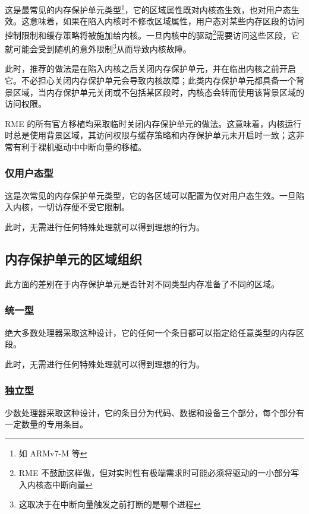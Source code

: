 这是最常见的内存保护单元类型\footnote{如 ARMv7-M 等}，它的区域属性既对内核态生效，也对用户态生效。这意味着，如果在陷入内核时不修改区域属性，用户态对某些内存区段的访问控制限制和缓存策略将被施加给内核。一旦内核中的驱动\footnote{RME 不鼓励这样做，但对实时性有极端需求时可能必须将驱动的一小部分写入内核态中断向量}需要访问这些区段，它就可能会受到随机的意外限制\footnote{这取决于在中断向量触发之前打断的是哪个进程}从而导致内核故障。

此时，推荐的做法是在陷入内核之后关闭内存保护单元，并在临出内核之前开启它。不必担心关闭内存保护单元会导致内核故障；此类内存保护单元都具备一个背景区域，当内存保护单元关闭或不包括某区段时，内核态会转而使用该背景区域的访问权限。

RME 的所有官方移植均采取临时关闭内存保护单元的做法。这意味着，内核运行时总是使用背景区域，其访问权限与缓存策略和内存保护单元未开启时一致；这非常有利于裸机驱动中中断向量的移植。

\subsubsection{仅用户态型}\label{subsubsec:9-mpu-user-mode-only}

这是次常见的内存保护单元类型，它的各区域可以配置为仅对用户态生效。一旦陷入内核，一切访存便不受它限制。

此时，无需进行任何特殊处理就可以得到理想的行为。

\subsection{内存保护单元的区域组织}\label{subsec:9-mpu-region-organization}

此方面的差别在于内存保护单元是否针对不同类型内存准备了不同的区域。

\subsubsection{统一型}\label{subsubsec:9-mpu-unified}

绝大多数处理器采取这种设计，它的任何一个条目都可以指定给任意类型的内存区段。

此时，无需进行任何特殊处理就可以得到理想的行为。

\subsubsection{独立型}\label{subsubsec:9-mpu-separate}

少数处理器采取这种设计，它的条目分为代码、数据和设备三个部分，每个部分有一定数量的专用条目。


